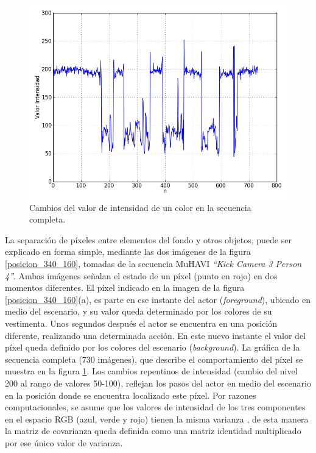 \begin{figure}[h!]
  \centering
      \includegraphics[scale=0.5]{img/ch3/figura_3_2}
  \caption[Cambios de intensidad en el tiempo del valor de un pixel ]{Cambios del valor de intensidad de un color en la secuencia completa.}
\label{intensidad_340_160}
\end{figure}


La separación de píxeles entre elementos del fondo y otros objetos, puede ser explicado en forma simple, mediante las dos imágenes de la figura \ref{posicion_340_160}, tomadas de la secuencia MuHAVI \textit{``Kick Camera 3 Person 4''}\cite{singh_muhavi_2010}. Ambas imágenes señalan el estado de un píxel (punto en rojo) en dos momentos diferentes. El píxel indicado en la imagen de la figura \ref{posicion_340_160}(a), es parte en ese instante del actor (\textit{foreground}), ubicado en medio del escenario, y su valor queda determinado por los colores de su vestimenta. Unos segundos después el actor se encuentra en una posición diferente, realizando una determinada acción. En este nuevo instante el valor del píxel queda definido por los colores del escenario (\textit{background}). La gráfica de la secuencia completa (730 imágenes), que describe el comportamiento del píxel se muestra en la figura \ref{intensidad_340_160}. Los cambios repentinos de intensidad (cambio del nivel 200 al rango de valores 50-100), reflejan los pasos del actor en medio del escenario en la posición donde se encuentra localizado este píxel. Por razones computacionales, se asume que los valores de intensidad de los tres componentes en el espacio RGB (azul, verde y rojo) tienen la misma varianza \cite{zivkovic_efficient_2006}, de esta manera la matriz de covarianza queda definida como una matriz identidad multiplicado por ese único valor de varianza.

